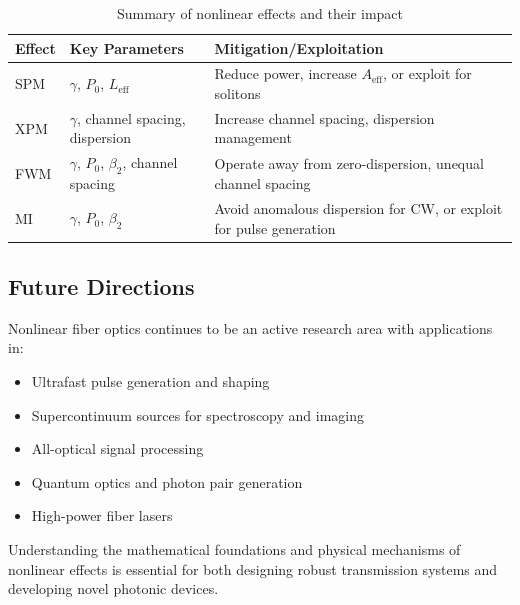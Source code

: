 \documentclass[a4paper, 11pt]{article}
\begin{document}
\begin{table}[H]
    \centering
    \caption{Summary of nonlinear effects and their impact}
    \label{tab:nonlinear_summary}
    \begin{tabularx}{\textwidth}{lXX}
        \toprule
        \textbf{Effect} & \textbf{Key Parameters} & \textbf{Mitigation/Exploitation} \\
        \midrule
        SPM & $\gamma$, $P_0$, $L_{\text{eff}}$ & Reduce power, increase $A_{\text{eff}}$, or exploit for solitons \\
        \addlinespace
        XPM & $\gamma$, channel spacing, dispersion & Increase channel spacing, dispersion management \\
        \addlinespace
        FWM & $\gamma$, $P_0$, $\beta_2$, channel spacing & Operate away from zero-dispersion, unequal channel spacing \\
        \addlinespace
        MI & $\gamma$, $P_0$, $\beta_2$ & Avoid anomalous dispersion for CW, or exploit for pulse generation \\
        \bottomrule
    \end{tabularx}
\end{table}

\subsection{Future Directions}

Nonlinear fiber optics continues to be an active research area with applications in:

\begin{itemize}[leftmargin=*]
    \item Ultrafast pulse generation and shaping
    \item Supercontinuum sources for spectroscopy and imaging
    \item All-optical signal processing
    \item Quantum optics and photon pair generation
    \item High-power fiber lasers
\end{itemize}

Understanding the mathematical foundations and physical mechanisms of nonlinear effects is essential for both designing robust transmission systems and developing novel photonic devices.
\end{document}
